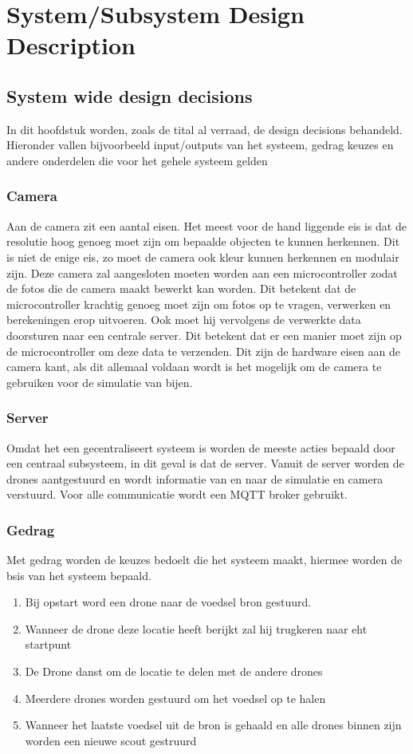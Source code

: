\section{System/Subsystem Design Description}

\subsection{System wide design decisions}
In dit hoofdstuk worden, zoals de tital al verraad, de design decisions behandeld. Hieronder vallen bijvoorbeeld
input/outputs van het systeem, gedrag keuzes en andere onderdelen die voor het gehele systeem gelden


\subsubsection{Camera}
Aan de camera zit een aantal eisen. Het meest voor de hand liggende eis is dat de resolutie hoog genoeg moet zijn
om bepaalde objecten te kunnen herkennen. Dit is niet de enige eis, zo moet de camera ook kleur kunnen herkennen
en modulair zijn. Deze camera zal aangesloten moeten worden aan een microcontroller
zodat de fotos die de camera maakt bewerkt kan worden. Dit betekent dat de microcontroller krachtig genoeg moet zijn
om fotos op te vragen, verwerken en berekeningen erop uitvoeren. Ook moet hij vervolgens de verwerkte data doorsturen
naar een centrale server. Dit betekent dat er een manier moet zijn op de microcontroller om deze data te verzenden.
Dit zijn de hardware eisen aan de camera kant, als dit allemaal voldaan wordt is het mogelijk om de camera te
gebruiken voor de simulatie van bijen.

\subsubsection{Server}
Omdat het een gecentraliseert systeem is worden de meeste acties bepaald door een centraal subsysteem, in dit geval is dat de server.
Vanuit de server worden de drones aantgestuurd en wordt informatie van en naar de simulatie en camera verstuurd. Voor alle communicatie
wordt een MQTT broker gebruikt.

\subsubsection*{Gedrag}
Met gedrag worden de keuzes bedoelt die het systeem maakt, hiermee worden de bsis van het systeem bepaald.
\begin{enumerate}
    \item Bij opstart word een drone naar de voedsel bron gestuurd.
    \item Wanneer de drone deze locatie heeft berijkt zal hij trugkeren naar eht startpunt
    \item De Drone danst om de locatie te delen met de andere drones
    \item Meerdere drones worden gestuurd om het voedsel op te halen
    \item Wanneer het laatste voedsel uit de bron is gehaald en alle drones binnen zijn worden een nieuwe scout gestruurd
\end{enumerate}

